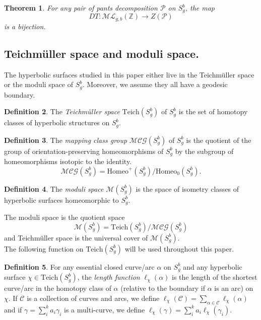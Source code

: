 \documentclass[a4paper,12pt]{article}
\newtheorem{theorem}{Theorem}[section]
\theoremstyle{definition}
\newtheorem{definition}[theorem]{Definition}
\theoremstyle{remark}
\begin{document}
\begin{theorem}\label{thm:DehnThurston}
    For any pair of pants decomposition $\mathcal{P}$ on $S_g^{b}$, the map
    \[
        DT : \mathcal{ML}_{g,b}(\mathbb{Z}) \to Z(\mathcal{P})
    \]
    is a bijection.
\end{theorem}




\subsection{Teichmüller space and moduli space.}


The hyperbolic surfaces studied in this paper either live in the Teichmüller space or the moduli space of $S_g^b$. Moreover, we assume they all have a geodesic boundary. 

\begin{definition}
    The \emph{Teichmüller space} $\mathrm{Teich}(S_g^b)$ of $S_g^b$ is the set of homotopy classes of hyperbolic structures on $S_g^b$.
\end{definition}

\begin{definition}
    The \emph{mapping class group} $\mathcal{MCG}(S_g^b)$ of $S_g^b$ is the quotient of the group of orientation-preserving homeomorphisms of $S_g^b$ by the subgroup of homeomorphisms isotopic to the identity.
    \[
        \mathcal{MCG}(S_g^b) = \mathrm{Homeo}^+(S_g^b)/\mathrm{Homeo}_0(S_g^b).
    \]
\end{definition}

\begin{definition}
    The \emph{moduli space} $ \mathcal{M}(S_g^b)$ is the space of isometry classes of hyperbolic surfaces homeomorphic to $S_g^b$.
\end{definition}

The moduli space is the quotient space
\[
    \mathcal{M}(S_g^b) = \mathrm{Teich}(S_g^b)/\mathcal{MCG}(S_g^b)
\]
and Teichmüller space is the universal cover of $\mathcal{M}(S_g^b)$.\\


The following function on $\mathrm{Teich}(S_g^b)$ will be used throughout this paper.
\begin{definition}
    For any essential closed curve/arc $\alpha$ on $S_g^b$ and any hyperbolic surface $\chi \in \mathrm{Teich}(S_g^b)$, the \emph{length function} $\ell_{\chi}(\alpha)$ is the length of the shortest curve/arc in the homotopy class of $\alpha$ (relative to the boundary if $\alpha$ is an arc) on~$\chi$. 
    If $\mathcal{C}$ is a collection of curves and arcs, we define $\ell_{\chi}(\mathcal{C}) = \sum_{\alpha \in \mathcal{C}} \ell_{\chi}(\alpha) $ and if $\gamma=\sum_i^k a_i\gamma_i$ is a multi-curve, we define $\ell_\chi(\gamma)=\sum_i^k a_i\ell_\chi(\gamma_i)$.
\end{definition}
\end{document}
